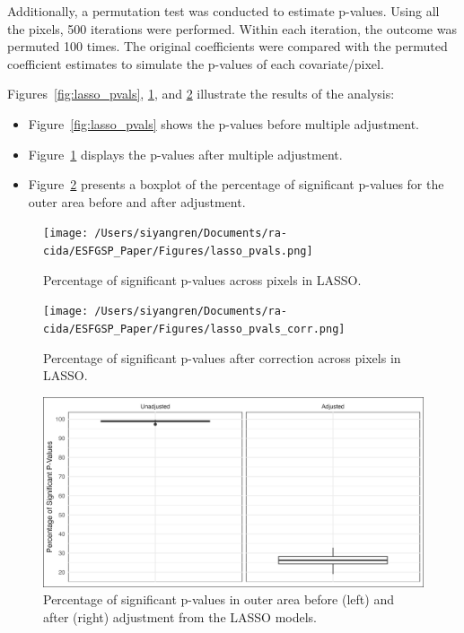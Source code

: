 \documentclass[12pt]{article}
\begin{document}
Additionally, a permutation test was conducted to estimate p-values. Using all the pixels, 500 iterations were performed. Within each iteration, the outcome was permuted 100 times. The original coefficients were compared with the permuted coefficient estimates to simulate the p-values of each covariate/pixel.

Figures~\ref{fig:lasso_pvals}, \ref{fig:lasso_pvals_corr}, and \ref{fig:lasso_boxplot} illustrate the results of the analysis:
\begin{itemize}
  \item Figure~\ref{fig:lasso_pvals} shows the p-values before multiple adjustment.
  \item Figure~\ref{fig:lasso_pvals_corr} displays the p-values after multiple adjustment.
  \item Figure~\ref{fig:lasso_boxplot} presents a boxplot of the percentage of significant p-values for the outer area before and after adjustment.
\end{itemize}


\begin{figure}[h]
  \centering
  \begin{minipage}[b]{0.45\textwidth}
    \texttt{[image: /Users/siyangren/Documents/ra-cida/ESFGSP\_Paper/Figures/lasso\_pvals.png]}
    \caption{Percentage of significant p-values across pixels in LASSO.}
    \label{fig:lasso_pvals}
  \end{minipage}
  \hfill %
  \begin{minipage}[b]{0.45\textwidth}
    \texttt{[image: /Users/siyangren/Documents/ra-cida/ESFGSP\_Paper/Figures/lasso\_pvals\_corr.png]}
    \caption{Percentage of significant p-values after correction across pixels in LASSO.}
    \label{fig:lasso_pvals_corr}
  \end{minipage}
\end{figure}

\begin{figure}[h]
  \centering
  \includegraphics[width=\textwidth]{../Figures/lasso_boxplots.png}
  \caption{Percentage of significant p-values in outer area before (left) and after (right) adjustment from the LASSO models.}
  \label{fig:lasso_boxplot}
\end{figure}
\end{document}

